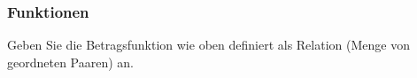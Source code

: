 \subsubsection{Funktionen}

\begin{example}
Geben Sie die Betragsfunktion wie oben definiert als Relation (Menge von geordneten Paaren) an.
\end{example}
\begin{example}
    {~\answerspace{5cm}}
\end{example}